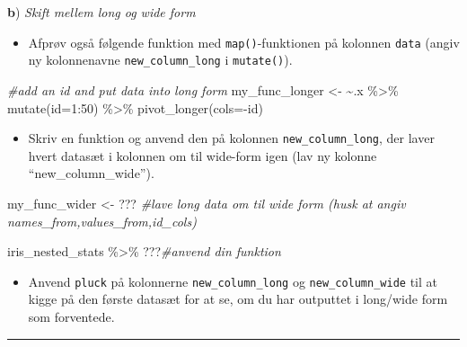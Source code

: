 \documentclass[
]{book}
\newenvironment{Shaded}{\begin{snugshade}}{\end{snugshade}}
\newcommand{\AttributeTok}[1]{\textcolor[rgb]{0.77,0.63,0.00}{#1}}
\newcommand{\CommentTok}[1]{\textcolor[rgb]{0.56,0.35,0.01}{\textit{#1}}}
\newcommand{\DecValTok}[1]{\textcolor[rgb]{0.00,0.00,0.81}{#1}}
\newcommand{\ErrorTok}[1]{\textcolor[rgb]{0.64,0.00,0.00}{\textbf{#1}}}
\newcommand{\FunctionTok}[1]{\textcolor[rgb]{0.00,0.00,0.00}{#1}}
\newcommand{\NormalTok}[1]{#1}
\newcommand{\OtherTok}[1]{\textcolor[rgb]{0.56,0.35,0.01}{#1}}
\newcommand{\SpecialCharTok}[1]{\textcolor[rgb]{0.00,0.00,0.00}{#1}}
\providecommand{\tightlist}{%
  \setlength{\itemsep}{0pt}\setlength{\parskip}{0pt}}
\begin{document}
\textbf{b}) \emph{Skift mellem long og wide form}

\begin{itemize}
\tightlist
\item
  Afprøv også følgende funktion med \texttt{map()}-funktionen på kolonnen \texttt{data} (angiv ny kolonnenavne \texttt{new\_column\_long} i \texttt{mutate()}).
\end{itemize}

\begin{Shaded}
\begin{Highlighting}[]
\CommentTok{\#add an id and put data into long form}
\NormalTok{my\_func\_longer }\OtherTok{\textless{}{-}} \ErrorTok{\textasciitilde{}}\NormalTok{.x }\SpecialCharTok{\%\textgreater{}\%} \FunctionTok{mutate}\NormalTok{(}\AttributeTok{id=}\DecValTok{1}\SpecialCharTok{:}\DecValTok{50}\NormalTok{) }\SpecialCharTok{\%\textgreater{}\%} \FunctionTok{pivot\_longer}\NormalTok{(}\AttributeTok{cols=}\SpecialCharTok{{-}}\NormalTok{id)}
\end{Highlighting}
\end{Shaded}

\begin{itemize}
\tightlist
\item
  Skriv en funktion og anvend den på kolonnen \texttt{new\_column\_long}, der laver hvert datasæt i kolonnen om til wide-form igen (lav ny kolonne ``new\_column\_wide'').
\end{itemize}

\begin{Shaded}
\begin{Highlighting}[]
\NormalTok{my\_func\_wider }\OtherTok{\textless{}{-}}\NormalTok{ ??? }\CommentTok{\#lave long data om til wide form (husk at angiv names\_from,values\_from,id\_cols)}
  
\NormalTok{iris\_nested\_stats }\SpecialCharTok{\%\textgreater{}\%}\NormalTok{ ???}\CommentTok{\#anvend din funktion  }
\end{Highlighting}
\end{Shaded}

\begin{itemize}
\tightlist
\item
  Anvend \texttt{pluck} på kolonnerne \texttt{new\_column\_long} og \texttt{new\_column\_wide} til at kigge på den første datasæt for at se, om du har outputtet i long/wide form som forventede.
\end{itemize}

\begin{center}\rule{0.5\linewidth}{0.5pt}\end{center}
\end{document}
